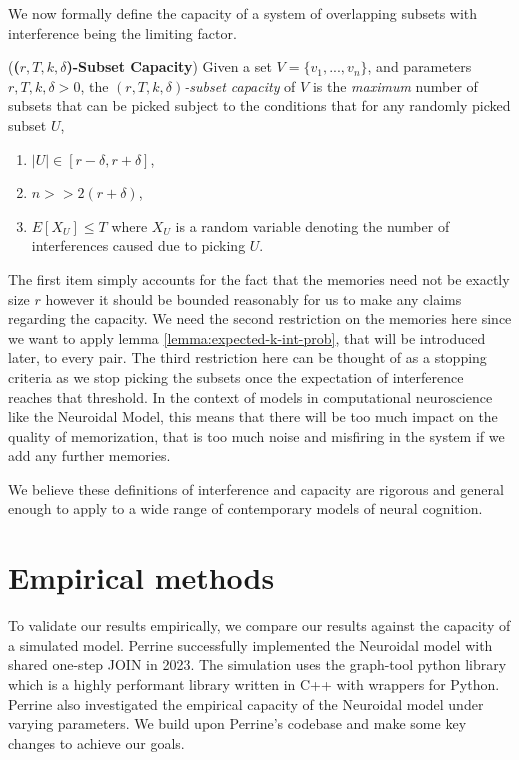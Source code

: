 We now formally define the capacity of a system of overlapping subsets with interference being the limiting factor. 

    \begin{definition} (\textbf{(\textit{$r,T,k,\delta$})-Subset Capacity}) Given a set $V = \{v_1,...,v_n\}$, and parameters $r, T, k, \delta > 0$, the \textit{$(r,T,k,\delta)$-subset capacity} of $V$ is the \textit{maximum} number of subsets that can be picked subject to the conditions that for any randomly picked subset $U$,
        \begin{enumerate}
            \item $|U| \in [r-\delta,r+\delta]$,
            \item $n >> 2(r+\delta)$,
            \item \label{equ:cap-bound-expected}$E[X_U] \le T$ where $X_U$ is a random variable denoting the number of interferences caused due to picking $U$. 
        \end{enumerate}
    \end{definition}

    The first item simply accounts for the fact that the memories need not be exactly size $r$ however it should be bounded reasonably for us to make any claims regarding the capacity. We need the second restriction on the memories here since we want to apply lemma \ref{lemma:expected-k-int-prob}, that will be introduced later, to every pair. The third restriction here can be thought of as a stopping criteria as we stop picking the subsets once the expectation of interference reaches that threshold. In the context of models in computational neuroscience like the Neuroidal Model, this means that there will be too much impact on the quality of memorization, that is too much noise and misfiring in the system if we add any further memories.

    We believe these definitions of interference and capacity are rigorous and general enough to apply to a wide range of contemporary models of neural cognition. 

\section{Empirical methods}

To validate our results empirically, we compare our results against the capacity of a simulated model. Perrine successfully implemented the Neuroidal model with shared one-step JOIN in 2023. The simulation uses the graph-tool python library which is a highly performant library written in C++ with wrappers for Python. Perrine also investigated the empirical capacity of the Neuroidal model under varying parameters. We build upon Perrine's codebase and make some key changes to achieve our goals. 

